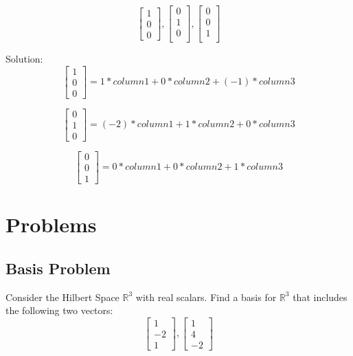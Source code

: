 \documentclass[11pt]{article}
\begin{document}
\begin{center}
\[
\begin{bmatrix}
   1        \\
    0      \\
   0          
\end{bmatrix}
,
\begin{bmatrix}
      0        \\
    1      \\
   0       \\    
\end{bmatrix}
,
\begin{bmatrix}
   0        \\
    0     \\
   1    \\
    
\end{bmatrix}
\]
\end{center}

\vspace{4mm}
Solution:
\[
\begin{bmatrix}
   1        \\
    0      \\
   0          
\end{bmatrix}
= 1*column1 + 0*column2 +(-1)*column3
\]

\[
\begin{bmatrix}
   0      \\
    1      \\
   0          
\end{bmatrix}
= (-2)*column1 + 1*column2 +0*column3
\]

\[
\begin{bmatrix}
   0      \\
    0      \\
   1          
\end{bmatrix}
= 0*column1 + 0*column2 +1*column3
\]



\section{Problems}

\subsection{Basis Problem}

Consider the Hilbert Space $\mathbb{R}^3$ with real scalars. Find a basis for $\mathbb{R}^3$  that includes the following two vectors:
\[
\begin{bmatrix}
   1        \\
    -2      \\
    1      
\end{bmatrix}
,
\begin{bmatrix}
    1  \\
    4 \\
    -2 
\end{bmatrix}
\]
\end{document}
